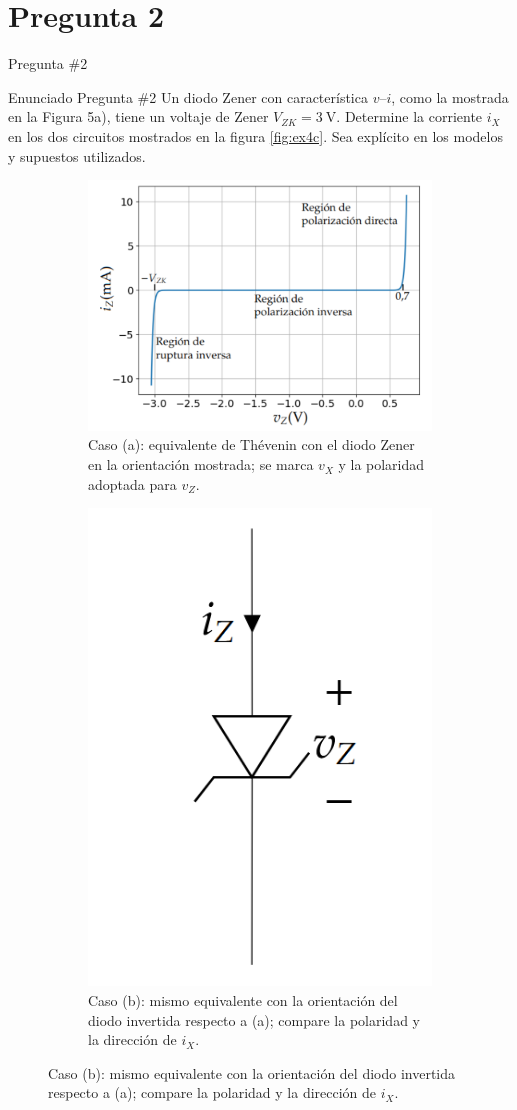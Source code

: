 \documentclass[
    10pt,
    aspectratio=169,
    xcolor={dvipsnames},
    spanish,
    ]{beamer}
\begin{document}
\section{Pregunta 2}
\begin{frame}{Pregunta \#2}
  \footnotesize
  \begin{block}{Enunciado Pregunta \#2}
 Un diodo Zener con característica $v$--$i$, como la mostrada en la Figura 5a), tiene un voltaje de Zener $V_{ZK}=3\ \mathrm{V}$. Determine la corriente $i_X$ en los dos circuitos mostrados en la figura \ref{fig:ex4c}. Sea explícito en los modelos y supuestos utilizados.  
  \end{block}

  \begin{figure}[H]
  \centering

  \begin{subfigure}[b]{0.48\textwidth}
    \centering
    \includegraphics[width=0.9\linewidth]{Auxiliar_4_5}
    \caption{Caso (a): equivalente de Thévenin con el diodo Zener en la orientación mostrada; se marca $v_X$ y la polaridad adoptada para $v_Z$.}
    \label{fig:ex4a}
  \end{subfigure}\hfill
  \begin{subfigure}[b]{0.48\textwidth}
    \centering
    \includegraphics[width=0.45\linewidth]{Auxiliar_4_6}
    \caption{Caso (b): mismo equivalente con la orientación del diodo invertida respecto a (a); compare la polaridad y la dirección de $i_X$.}
    \label{fig:ex4b}
  \end{subfigure}


\end{figure}
\end{frame}
\end{document}
